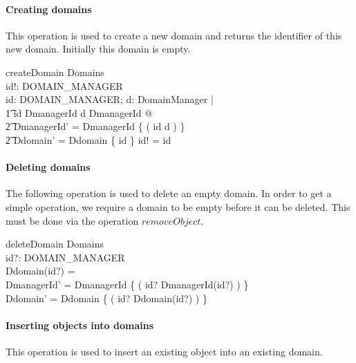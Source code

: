 \paragraph{Creating domains} 
This operation is used to create a new domain and returns the identifier of this
new domain.  Initially this domain is empty.
\begin{schema}{createDomain}
  \Delta Domains \\
  id!: DOMAIN\_MANAGER \\
  \where
  \exists id: DOMAIN\_MANAGER; d: DomainManager | \\
  \t1 id \notin \dom DmanagerId \land d \notin \ran DmanagerId @ \\
  \t2 DmanagerId' = DmanagerId \cup \{ ( id \mapsto d ) \} \land \\
  \t2 Ddomain' = Ddomain \cup \{ id \mapsto \emptyset \} \land id! = id \\
\end{schema}


\paragraph{Deleting domains}
The following operation is used to delete an empty domain.  In order to get a
simple operation, we require a domain to be empty before it can be deleted.
This must be done via the operation $removeObject$.
\begin{schema}{deleteDomain}
  \Delta Domains \\
  id?: DOMAIN\_MANAGER \\
  \where
  Ddomain(id?) = \emptyset \\
  DmanagerId' = DmanagerId \setminus \{ ( id? \mapsto DmanagerId(id?) ) \} \\
  Ddomain' = Ddomain \setminus \{ ( id? \mapsto Ddomain(id?) ) \} \\
\end{schema}


\paragraph{Inserting objects into domains}
This operation is used to insert an existing object into an existing domain.  

